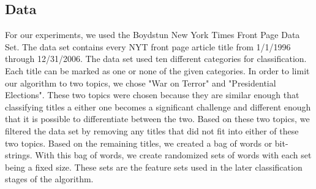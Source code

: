 \documentclass{sig-alternate}
\begin{document}
\subsection{Data}
For our experiments, we used the Boydstun New York Times Front Page Data Set\cite{boydstun}. The data set contains every NYT front page article title from 1/1/1996 through 12/31/2006. The data set used ten different categories for classification. Each title can be marked as one or none of the given categories. In order to limit our algorithm to two topics, we chose "War on Terror" and "Presidential Elections". These two topics were chosen because they are similar enough that classifying titles a either one becomes a significant challenge and different enough that it is possible to differentiate between the two. Based on these two topics, we filtered the data set by removing any titles that did not fit into either of these two topics. Based on the remaining titles, we created a bag of words or bit-strings. With this bag of words, we create randomized sets of words with each set being a fixed size. These sets are the feature sets used in the later classification stages of the algorithm.
 
\end{document}
